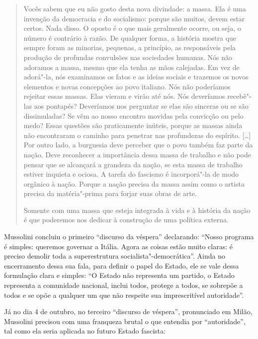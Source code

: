 \begin{quote}
Vocês sabem que eu não gosto desta nova divindade: a massa. Ela é uma
invenção da democracia e do socialismo: porque são muitos, devem estar
certos. Nada disso. O oposto é o que mais geralmente ocorre, ou seja, o
número é contrário à razão. De qualquer forma, a história mostra que
sempre foram as minorias, pequenas, a princípio, as responsáveis pela
produção de profundas convulsões nas sociedades humanas. Nós não
adoramos a massa, mesmo que ela tenha as mãos calejadas. Em vez de
adorá"-la, nós examinamos os fatos e as ideias sociais e trazemos os
novos elementos e novas concepções ao povo italiano. Nós não poderíamos
rejeitar essas massas. Elas vieram e virão até nós. Nós deveríamos
recebê"-las aos pontapés? Deveríamos nos perguntar se elas são sinceras
ou se são dissimuladas? Se vêm ao nosso encontro movidas pela convicção
ou pelo medo? Essas questões são praticamente inúteis, porque as massas
ainda não encontraram o caminho para penetrar nas profundezas do
espírito. {[}\ldots{}{]} Por outro lado, a burguesia deve perceber que o povo
também faz parte da nação. Deve reconhecer a importância dessa massa de
trabalho e não pode pensar que se alcançará a grandeza da nação, se esta
massa de trabalho estiver inquieta e ociosa. A tarefa do fascismo é
incorporá"-la de modo orgânico à nação. Porque a nação precisa da massa
assim como o artista precisa da matéria"-prima para forjar suas obras de
arte.

Somente com uma massa que esteja integrada à vida e à história da nação
é que poderemos nos dedicar à construção de uma política externa.
\end{quote}

Mussolini concluiu o primeiro ``discurso da véspera'' declarando: ``Nosso
programa é simples: queremos governar a Itália. Agora as coisas estão
muito claras: é preciso demolir toda a superestrutura
socialista"-democrática''. Ainda no encerramento dessa sua fala, para
definir o papel do Estado, ele se vale dessa formulação clara e simples:
``O Estado não representa um partido, o Estado representa a comunidade
nacional, inclui todos, protege a todos, se sobrepõe a todos e se opõe a
qualquer um que não respeite sua imprescritível autoridade''.

Já no dia 4 de outubro, no terceiro ``discurso de véspera'', pronunciado
em Milão, Mussolini precisou com uma franqueza brutal o que entendia por
``autoridade'', tal como ela seria aplicada no futuro Estado fascista:

